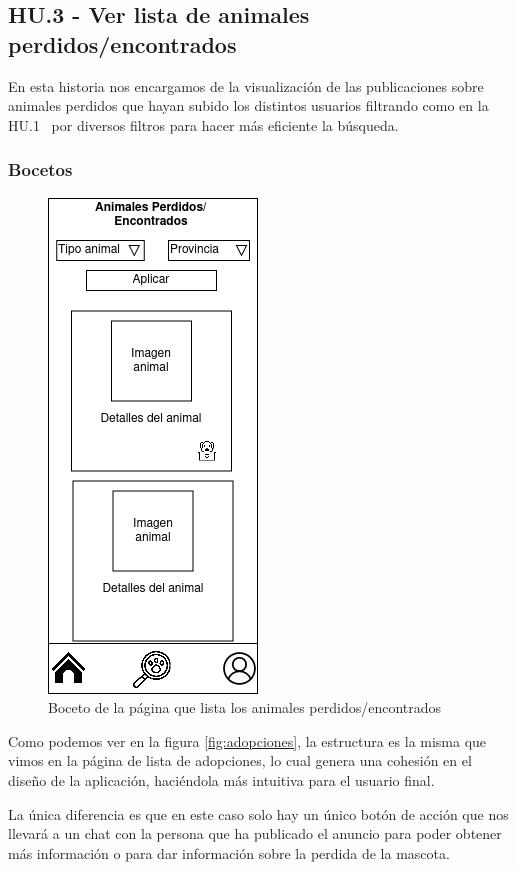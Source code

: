 \subsection{HU.3 - Ver lista de animales perdidos/encontrados}

En esta historia nos encargamos de la visualización de las publicaciones sobre animales perdidos que hayan subido los distintos usuarios filtrando como en la HU.1~\pageref{sec:hu1} por diversos filtros para hacer más eficiente la búsqueda.

\subsubsection{Bocetos}

\begin{figure}[H]
	\centering
	\includegraphics[width=0.31\linewidth]{"sprint 2/hu3/listaPerdidos"}
	\caption{Boceto de la página que lista los animales perdidos/encontrados}
	\label{fig:listaperdidos}
\end{figure}

Como podemos ver en la figura \ref{fig:adopciones}, la estructura es la misma que vimos en la página de lista de adopciones, lo cual genera una cohesión en el diseño de la aplicación, haciéndola más intuitiva para el usuario final.

La única diferencia es que en este caso solo hay un único botón de acción que nos llevará a un chat con la persona que ha publicado el anuncio para poder obtener más información o para dar información sobre la perdida de la mascota.

